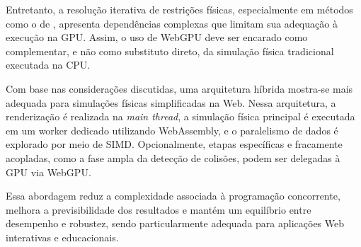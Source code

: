 Entretanto, a resolução iterativa de restrições físicas, especialmente em métodos como o de , apresenta dependências complexas que limitam sua adequação à execução na GPU. Assim, o uso de WebGPU deve ser encarado como complementar, e não como substituto direto, da simulação física tradicional executada na CPU.

Com base nas considerações discutidas, uma arquitetura híbrida mostra-se mais adequada para simulações físicas simplificadas na Web. Nessa arquitetura, a renderização é realizada na \textit{main thread}, a simulação física principal é executada em um worker dedicado utilizando WebAssembly, e o paralelismo de dados é explorado por meio de SIMD. Opcionalmente, etapas específicas e fracamente acopladas, como a fase ampla da detecção de colisões, podem ser delegadas à GPU via WebGPU.

Essa abordagem reduz a complexidade associada à programação concorrente, melhora a previsibilidade dos resultados e mantém um equilíbrio entre desempenho e robustez, sendo particularmente adequada para aplicações Web interativas e educacionais.
